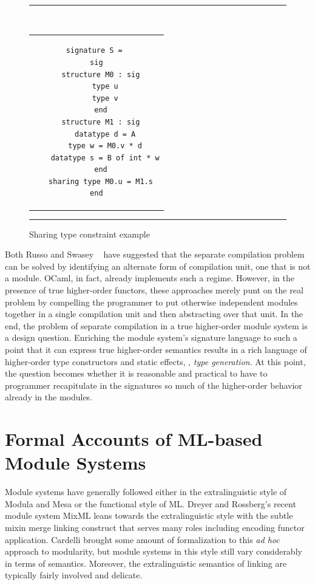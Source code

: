 \begin{figure}	
\hrule
~
\begin{center}
\begin{tabular}{c}	
\begin{lstlisting}
signature S = 
sig
  structure M0 : sig
    type u
    type v
  end
  structure M1 : sig
    datatype d = A
    type w = M0.v * d
    datatype s = B of int * w
  end
  sharing type M0.u = M1.s
end
\end{lstlisting}
\end{tabular}
\end{center}
\hrule
\caption{Sharing type constraint example}
\label{fig:crisscross}
\end{figure}

		Both Russo \cite{russothesis} and Swasey \etal~\cite{swasey06} have suggested that the separate compilation problem can be solved by identifying an alternate form of compilation unit, one that is not a module. OCaml, in fact, already implements such a regime. However, in the presence of true higher-order functors, these approaches merely punt on the real problem by compelling the programmer to put otherwise independent modules together in a single compilation unit and then abstracting over that unit. In the end, the problem of separate compilation in a true higher-order module system is a design question. Enriching the module system's signature language to such a point that it can express true higher-order semantics results in a rich language of higher-order type constructors and static effects, \ie, \emph{type generation}. At this point, the question becomes whether it is reasonable and practical to have to programmer recapitulate in the signatures so much of the higher-order behavior already in the modules. 

\section{Formal Accounts of ML-based Module Systems}
Module systems have generally followed either in the extralinguistic style of Modula and Mesa or the functional style of ML. Dreyer and Rossberg's recent module system MixML \cite{mixml}  leans towards the extralinguistic style with the subtle mixin merge linking construct that serves many roles including encoding functor application. Cardelli \cite{cardelli97} brought some amount of formalization to this {\it ad hoc} approach to modularity, but module systems in this style still vary considerably in terms of semantics. Moreover, the extralinguistic semantics of linking are typically fairly involved and delicate.


